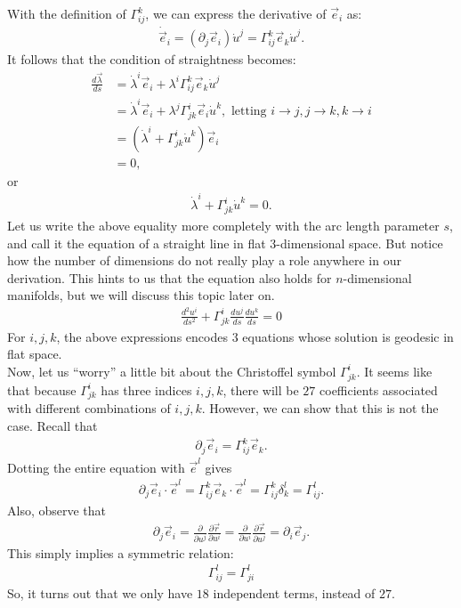\documentclass{book}
\theoremstyle{definition}
\begin{document}
With the definition of $\Gamma^{k}_{ij}$, we can express the derivative of $\vec{e}_i$ as:
\begin{align*}
\dot{\vec{e}}_i = \left(\partial_j\vec{e}_i \right)\dot{u}^j = \Gamma^{k}_{ij}\vec{e}_k\dot{u}^j. 
\end{align*}
It follows that the condition of straightness becomes:
\begin{align*}
\frac{d\vec{\lambda}}{ds} &= \dot{\lambda}^i\vec{e}_i + \lambda^i \Gamma^{k}_{ij}\vec{e}_k\dot{u}^j\\
&= \dot{\lambda}^i\vec{e}_i + \lambda^j \Gamma^{i}_{jk}\vec{e}_i\dot{u}^k, \text{ letting $i\rightarrow j, j\rightarrow k, k \rightarrow i$}\\
&= \left(\dot{\lambda}^i + \Gamma^{i}_{jk}\dot{u}^k \right)\vec{e}_i\\
&= 0, 
\end{align*}
or
\begin{align*}
\dot{\lambda}^i + \Gamma^{i}_{jk}\dot{u}^k = 0.
\end{align*}
Let us write the above equality more completely with the arc length parameter $s$, and call it the equation of a straight line in flat 3-dimensional space. But notice how the number of dimensions do not really play a role anywhere in our derivation. This hints to us that the equation also holds for $n$-dimensional manifolds, but we will discuss this topic later on.
\begin{align*}
\boxed{\frac{d^2u^i}{ds^2} + \Gamma^{i}_{jk}\frac{du^j}{ds}\frac{du^k}{ds} = 0}
\end{align*}
For $i,j,k$, the above expressions encodes $3$ equations whose solution is geodesic in flat space.\\ 

Now, let us ``worry'' a little bit about the Christoffel symbol $\Gamma^{i}_{jk}$. It seems like that because $\Gamma^{i}_{jk}$ has three indices $i,j,k$, there will be $27$ coefficients associated with different combinations of $i,j,k$. However, we can show that this is not the case. Recall that
\begin{align*}
\partial_j \vec{e}_i = \Gamma^{k}_{ij}\vec{e}_k.
\end{align*}
Dotting the entire equation with $\vec{e}^l$ gives
\begin{align*}
\partial_j \vec{e}_i\cdot\vec{e}^l = \Gamma^{k}_{ij}\vec{e}_k\cdot\vec{e}^l = \Gamma^{k}_{ij}\delta^l_k = \Gamma^{l}_{ij}.
\end{align*}
Also, observe that 
\begin{align*}
\partial_j\vec{e}_i = \frac{\partial }{\partial u^j}\frac{\partial \vec{r}}{\partial u^i} = \frac{\partial }{\partial u^i}\frac{\partial \vec{r}}{\partial u^j} = \partial_i\vec{e}_j.
\end{align*}
This simply implies a symmetric relation:
\begin{align*}
\boxed{\Gamma^{l}_{ij} = \Gamma^{l}_{ji}}
\end{align*}
So, it turns out that we only  have $18$ independent terms, instead of $27$.\\
\end{document}
